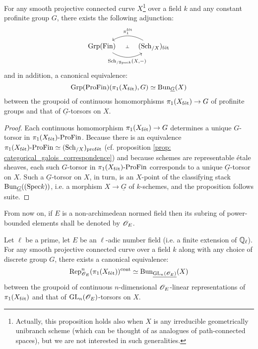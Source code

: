         \begin{proposition} \label{prop: etale_eckmann_hilton_duality}
            For any smooth projective connected curve $X$\footnote{Actually, this proposition holds also when $X$ is any irreducible geometrically unibranch scheme (which can be thought of as analogues of path-connected spaces), but we are not interested in such generalities.} over a field $k$ and any constant profinite group $G$, there exists the following adjunction:
                $$
                    \begin{tikzcd}
                    	{\Grp(\Fin)} & {(\Sch_{/X})_{\fet}}
                    	\arrow[""{name=0, anchor=center, inner sep=0}, "{\Sch_{/\Spec k}(X, -)}"', bend right, from=1-1, to=1-2]
                    	\arrow[""{name=1, anchor=center, inner sep=0}, "{\pi_1^{\fet}}"', bend right, from=1-2, to=1-1]
                    	\arrow["\dashv"{anchor=center, rotate=-90}, draw=none, from=1, to=0]
                    \end{tikzcd}
                $$
            and in addition, a canonical equivalence:
                $$\mathrm{Grp}(\mathrm{Pro}\mathrm{Fin})(\pi_1(X_{\mathrm{f\acute{e}t}}), G) \simeq \mathrm{Bun}_{\underline{G}}(X)$$
            between the groupoid of continuous homomorphisms $\pi_1(X_{\mathrm{f\acute{e}t}}) \to G$ of profinite groups and that of $\underline{G}$-torsors on $X$.
        \end{proposition}
            \begin{proof}
                Each continuous homomorphism $\pi_1(X_{\mathrm{f\acute{e}t}}) \to G$ determines a unique $G$-torsor in $\pi_1(X_{\mathrm{f\acute{e}t}})\text{-}\mathrm{Pro}\mathrm{Fin}$. Because there is an equivalence $\pi_1(X_{\mathrm{f\acute{e}t}})\text{-}\mathrm{Pro}\mathrm{Fin} \simeq (\mathrm{Sch}_{/X})_{\mathrm{prof\acute{e}t}}$ (cf. proposition \ref{prop: categorical_galois_correspondence}) and because schemes are representable \'etale sheaves, each such $G$-torsor in $\pi_1(X_{\mathrm{f\acute{e}t}})\text{-}\mathrm{Pro}\mathrm{Fin}$ corresponds to a unique $\underline{G}$-torsor on $X$. Such a $\underline{G}$-torsor on $X$, in turn, is an $X$-point of the classifying stack $\mathrm{Bun}_{\underline{G}}((\mathrm{Spec} k))$, i.e. a morphism $X \to \underline{G}$ of $k$-schemes, and the proposition follows suite.
            \end{proof}
        \begin{convention}
            From now on, if $E$ is a non-archimedean normed field then its subring of power-bounded elements shall be denoted by $\mathscr{O}_E$. 
        \end{convention}
        \begin{corollary} \label{coro: continuous_representations_of_the_etale_fundamental_group_are_torsors}
            Let $\ell$ be a prime, let $E$ be an $\ell$-adic number field (i.e. a finite extension of $\mathbb{Q}_{\ell}$). For any smooth projective connected curve over a field $k$ along with any choice of discrete group $G$, there exists a canonical equivalence:
                $$\mathrm{Rep}^n_{\mathscr{O}_E}(\pi_1(X_{\mathrm{f\acute{e}t}}))^{\mathrm{cont}} \simeq \mathrm{Bun}_{\underline{\operatorname{GL}_n(\mathscr{O}_E)}}(X)$$
            between the groupoid of continuous $n$-dimensional $\mathscr{O}_E$-linear representations of $\pi_1(X_{\mathrm{f\acute{e}t}})$ and that of $\operatorname{GL}_n(\mathscr{O}_E)$-torsors on $X$.
        \end{corollary}
